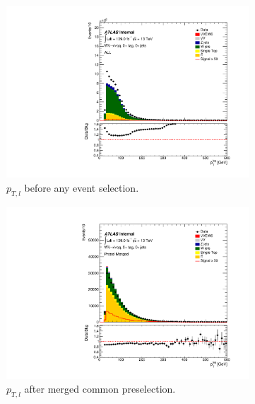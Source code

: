 \begin{figure}[ht]
        \begin{subfigure}{0.32\textwidth}
            \includegraphics[width=\linewidth]{figures/event_selection/ALL_PtL.pdf}
	    \caption{$p_{T,l}$ before any event selection.\\ \hbox{\vspace{1.5mm}}}
        \end{subfigure}
        \begin{subfigure}{0.32\textwidth}
            \includegraphics[width=\linewidth]{figures/event_selection/Presel_Merged_PtL.pdf}
            \caption{$p_{T,l}$ after merged common preselection.}
        \end{subfigure}
        \begin{subfigure}{0.32\textwidth}

\end{subfigure}
\end{figure}
